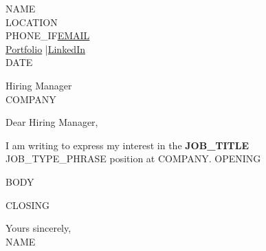 \documentclass[11pt,a4paper]{article}
\begin{document}
\begin{flushright}
{{NAME}}\\
{{LOCATION}}\\
{{PHONE_IF}}\href{mailto:{{EMAIL}}}{{{EMAIL}}}\\
\href{{{PORTFOLIO}}}{Portfolio} \quad|\quad \href{{{LINKEDIN}}}{LinkedIn}\\[6pt]
{{DATE}}
\end{flushright}

\vspace{12pt}

\noindent Hiring Manager\\
{{COMPANY}}

\vspace{12pt}

\noindent Dear Hiring Manager,

\vspace{6pt}

I am writing to express my interest in the \textbf{{{JOB_TITLE}}} {{JOB_TYPE_PHRASE}} position at {{COMPANY}}. {{OPENING}}

{{BODY}}

{{CLOSING}}

\vspace{18pt}

\noindent Yours sincerely,\\[18pt]
{{NAME}}
\end{document}
